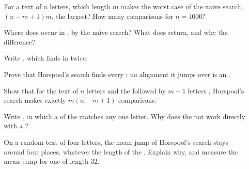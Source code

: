 \begin{exercise}[$\star\star$]\label{exo:g12:text-search:9}
For a text of $n$ letters, which  length $m$ makes the worst case of the naive search, $(n - m + 1)m$, the
largest? How many comparisons for $n = 1000$?
\end{exercise}

\begin{exercise}[$\star\star$]\label{exo:g12:text-search:10}
Where does  occur in , by the naive search? What does  return,
and why the difference?
\end{exercise}

\begin{exercise}[$\star\star$]\label{exo:g12:text-search:11}
Write , which finds  in  twice.
\end{exercise}

\begin{exercise}[$\star\star\star$]\label{exo:g12:text-search:12}
Prove that Horspool's search finds every : no alignment it jumps over is an .
\end{exercise}

\begin{exercise}[$\star\star\star$]\label{exo:g12:text-search:13}
Show that for the text of $n$ letters  and the   followed by $m - 1$ letters ,
Horspool's search makes exactly $m(n - m + 1)$ comparisons.
\end{exercise}

\begin{exercise}[$\star\star\star$]\label{exo:g12:text-search:14}
Write , in which a  of the  matches any one letter. Why does the  not work directly with a ?
\end{exercise}

\begin{exercise}[$\star\star\star$]\label{exo:g12:text-search:15}
On a random text of four letters, the mean jump of Horspool's search stays around four places, whatever the length of
the . Explain why, and measure the mean jump for one  of length $32$.
\end{exercise}

